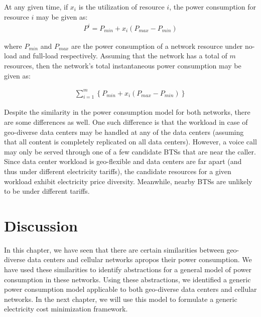 At any given time, if $x_i$ is the utilization of resource $i$, the power consumption for resource $i$ may be given as:
\begin{align}
P^i = P_{min} + x_i (P_{max} - P_{min})
\end{align}

where $P_{min}$ and $P_{max}$ are the power consumption of a network resource under no-load and full-load respectively. Assuming that the network has a total of $m$ resources, then the network's total instantaneous power consumption may be given as:

\begin{align}
\sum_{i=1}^m \left\{ P_{min} + x_i (P_{max} - P_{min}) \right\}
\label{eq:abdcpaper}
\end{align}

Despite the similarity in the power consumption model for both networks, there are some differences as well. One such difference is that the workload in case of geo-diverse data centers may be handled at any of the data centers (assuming that all content is completely replicated on all data centers). However, a voice call may only be served through one of a few candidate BTSs that are near the caller. Since data center workload is geo-flexible and data centers are far apart (and thus under different electricity tariffs), the candidate resources for a given workload exhibit electricity price diversity. Meanwhile, nearby BTSs are unlikely to be under different tariffs. 

\section{Discussion}
In this chapter, we have seen that there are certain similarities between geo-diverse data centers and cellular networks apropos their power consumption. We have used these similarities to identify abstractions for a general model of power consumption in these networks. Using these abstractions, we identified a generic power consumption model applicable to both geo-diverse data centers and cellular networks. In the next chapter, we will use this model to formulate a generic electricity cost minimization framework.